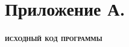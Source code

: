 \section*{Приложение А.}
\begin{center}
{\normalsize \textbf{\textsc{исходный код программы}}}
\end{center}
